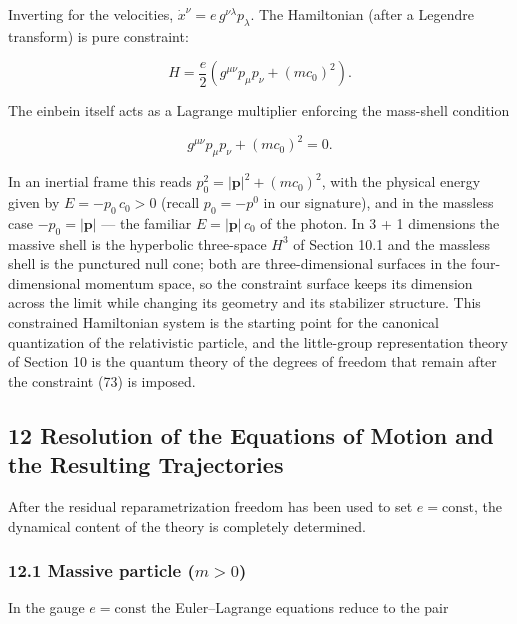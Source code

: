 \documentclass[
]{article}
\begin{document}
Inverting for the velocities,
\(\dot{x}^{\nu} = e\, g^{\nu\lambda} p_{\lambda}\). The Hamiltonian
(after a Legendre transform) is pure constraint:

\[H = \frac{e}{2} \left( g^{\mu\nu} p_{\mu} p_{\nu} + (mc_{0})^{2} \right). \tag{72}\]

The einbein itself acts as a Lagrange multiplier enforcing the
mass-shell condition

\[g^{\mu\nu} p_{\mu} p_{\nu} + (mc_{0})^{2} = 0. \tag{73}\]

In an inertial frame this reads
\(p_{0}^{2} = |\mathbf{p}|^{2} + (mc_{0})^{2}\), with the physical
energy given by \(E = -p_{0}\, c_{0} > 0\) (recall \(p_{0} = -p^{0}\) in
our signature), and in the massless case \(-p_{0} = |\mathbf{p}|\) ---
the familiar \(E = |\mathbf{p}|\, c_{0}\) of the photon. In 3 + 1
dimensions the massive shell is the hyperbolic three-space \(H^{3}\) of
Section 10.1 and the massless shell is the punctured null cone; both are
three-dimensional surfaces in the four-dimensional momentum space, so
the constraint surface keeps its dimension across the limit while
changing its geometry and its stabilizer structure. This constrained
Hamiltonian system is the starting point for the canonical quantization
of the relativistic particle, and the little-group representation theory
of Section 10 is the quantum theory of the degrees of freedom that
remain after the constraint (73) is imposed.

\hypertarget{resolution-of-the-equations-of-motion-and-the-resulting-trajectories}{%
\subsection{12 Resolution of the Equations of Motion and the Resulting
Trajectories}\label{resolution-of-the-equations-of-motion-and-the-resulting-trajectories}}

After the residual reparametrization freedom has been used to set
\(e = \mathrm{const}\), the dynamical content of the theory is
completely determined.

\hypertarget{massive-particle-m-0}{%
\subsubsection{\texorpdfstring{12.1 Massive particle
(\(m > 0\))}{12.1 Massive particle (m \textgreater{} 0)}}\label{massive-particle-m-0}}

In the gauge \(e = \mathrm{const}\) the Euler--Lagrange equations reduce
to the pair
\end{document}
